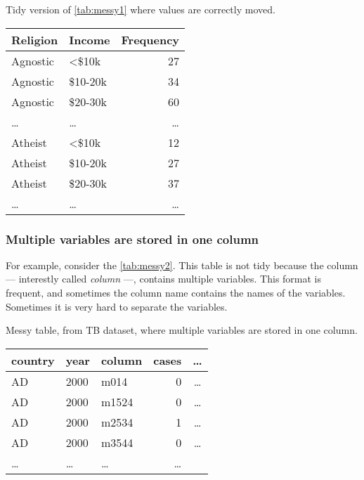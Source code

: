 \begin{tablebox}[label=tab:tidy1]{Tidy version of \cref{tab:messy1} where values are correctly moved.}
  \centering
  \begin{tabular}{l l r}
    \toprule
    \textbf{Religion} & \textbf{Income} & \textbf{Frequency} \\
    \midrule
    Agnostic & <\$10k & 27 \\
    Agnostic & \$10-20k & 34 \\
    Agnostic & \$20-30k & 60 \\
    \dots & \dots & \dots \\
    Atheist & <\$10k & 12 \\
    Atheist & \$10-20k & 27 \\
    Atheist & \$20-30k & 37 \\
    \dots & \dots & \dots \\
    \bottomrule
  \end{tabular}
\end{tablebox}

\clearpage
\subsubsection{Multiple variables are stored in one column}  For example, consider the
\cref{tab:messy2}.  This table is not tidy because the column --- interestly called
\emph{column} ---, contains multiple variables.  This format is frequent, and sometimes the
column name contains the names of the variables.  Sometimes it is very hard to separate
the variables.

\begin{tablebox}[label=tab:messy2]{Messy table, from TB dataset, where multiple variables are stored in one column.}
  \centering
  \begin{tabular}{l l l r c}
    \toprule
    \textbf{country} & \textbf{year} & \textbf{column} & \textbf{cases} & \textbf{\dots} \\
    \midrule
    AD & 2000 & m014 & 0 & \dots \\
    AD & 2000 & m1524 & 0 & \dots \\
    AD & 2000 & m2534 & 1 & \dots \\
    AD & 2000 & m3544 & 0 & \dots \\
    \dots & \dots & \dots & \dots \\
    \bottomrule
  \end{tabular}
\end{tablebox}

